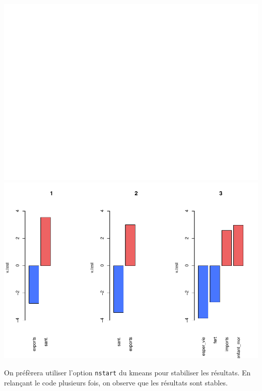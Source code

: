 \documentclass[
]{article}
\newenvironment{Shaded}{}{}
\newcommand{\AttributeTok}[1]{#1}
\newcommand{\DecValTok}[1]{#1}
\newcommand{\FunctionTok}[1]{#1}
\newcommand{\NormalTok}[1]{#1}
\newcommand{\OtherTok}[1]{\textcolor[rgb]{1.00,0.25,0.00}{#1}}
\newcommand{\SpecialCharTok}[1]{\textcolor[rgb]{0.00,0.50,0.50}{#1}}
\begin{document}
\includegraphics{Projet_files/figure-latex/unnamed-chunk-45-1.pdf}
\includegraphics{Projet_files/figure-latex/unnamed-chunk-45-2.pdf}

On préfèrera utiliser l'option \texttt{nstart} du kmeans pour stabiliser
les résultats. En relançant le code plusieurs fois, on observe que les
résultats sont stables.

\begin{Shaded}
\end{Shaded}
\end{document}

